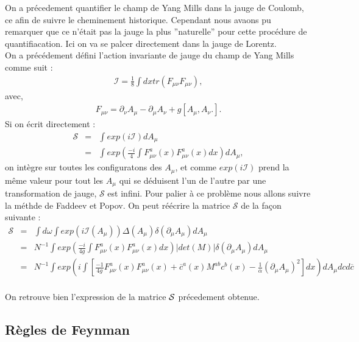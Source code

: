 \documentclass[a4paper,11pt]{article} %
\theoremstyle{plain}
\theoremstyle{definition}
\theoremstyle{remark}
\numberwithin{equation}{section}
\numberwithin{equation}{subsection}
\numberwithin{figure}{section}
\begin{document}
\noindent
On a précedement quantifier le champ de Yang Mills dans la jauge de Coulomb, ce afin de suivre le cheminement historique. Cependant 
nous avaons pu remarquer que ce n'était pas la jauge la plus ''naturelle'' pour cette procédure de quantifiacation. Ici on va se palcer 
directement dans la jauge de Lorentz. \\
On a précédement défini l'action invariante de jauge du champ de Yang Mills comme suit :
\begin{eqnarray*}
 \mathcal{I} = \frac{1}{8} \int dx tr ( F_{\mu \nu} F_{\mu \nu}  ) ,
\end{eqnarray*}
avec,
\begin{eqnarray*}
 F_{\mu \nu} = \partial_{\nu}A_{\mu} - \partial_{\mu}A_{\nu} + g \left[ A_{\mu} , A_{\nu} .\right] .
\end{eqnarray*}
Si on écrit directement :
\begin{eqnarray*}
 \mathcal{S} &=& \int exp\left( i \mathcal{I} \right) dA_{\mu}\\
	     &=& \int exp\left( \frac{-i}{4} \int F^{a}_{\mu\nu}(x)F^{a}_{\mu \nu}(x) dx \right) dA_{\mu}  ,
\end{eqnarray*}
on intègre sur toutes les configuratons des $A_{\mu}$, et comme $exp\left( i \mathcal{I} \right)$ prend la même valeur pour tout 
les $A_{\mu}$ qui se déduisent l'un de l'autre par une transformation de jauge, $\mathcal{S}$ est infini. Pour palier à ce problème 
nous allons suivre la méthde de Faddeev et Popov.  On peut réécrire la matrice $\mathcal{S}$ de la façon suivante :
\begin{eqnarray*}
 \mathcal{S} &=& \int d\omega \int exp\left( i \mathcal{I}(A_{\mu}) \right) 
\Delta(A_{\mu}) \delta \left(\partial_{\mu}A_{\mu}\right)dA_{\mu}\\
                 &=& N^{-1} \int exp\left( \frac{-i}{4g} \int F^{a}_{\mu\nu}(x)F^{a}_{\mu \nu}(x) dx \right) 
\left|det(M)\right| \delta \left(\partial_{\mu}A_{\mu}\right) dA_{\mu}\\
                 &=& N^{-1} \int exp\left(i \int \left[  
\frac{-1}{4g} F^{a}_{\mu\nu}(x)F^{a}_{\mu \nu}(x) + \overline{c}^{a}(x)M^{ab}c^{b}(x) - \frac{1}{\alpha} (\partial_{\mu}A_{\mu})^2  
\right] dx \right) dA_{\mu} dc d\overline{c}  \nonumber \\
\end{eqnarray*}

\noindent
On retrouve bien l'expression de la matrice $\cal{S}$ précedement obtenue.

  \subsection{Règles de Feynman}
\end{document}
